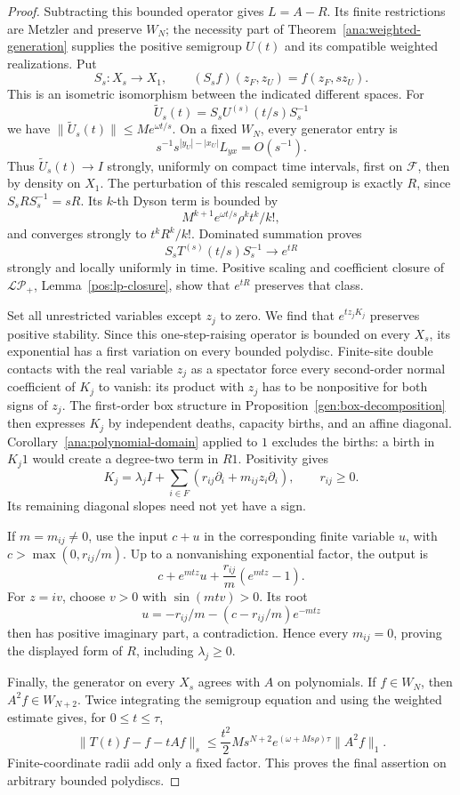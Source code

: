 \documentclass[reqno]{amsart}
\theoremstyle{definition}
\theoremstyle{remark}
\begin{document}
\begin{proof}
Subtracting this bounded operator gives \(L=A-R\).  Its finite restrictions
are Metzler and preserve \(W_N\); the necessity part of
Theorem~\ref{ana:weighted-generation} supplies the positive semigroup
\(U(t)\) and its compatible weighted realizations.  Put
\[
 S_s:X_s\longrightarrow X_1,\qquad
 (S_sf)(z_F,z_U)=f(z_F,sz_U).
\]
This is an isometric isomorphism between the indicated different spaces.
For
\[
 \widetilde U_s(t)=S_sU^{(s)}(t/s)S_s^{-1}
\]
we have \(\|\widetilde U_s(t)\|\le Me^{\omega t/s}\).
On a fixed \(W_N\), every generator entry is
\[
 s^{-1}s^{|y_U|-|x_U|}L_{yx}=O(s^{-1}).
\]
Thus \(\widetilde U_s(t)\to I\) strongly, uniformly on compact time
intervals, first on \(\mathcal F\), then by density on \(X_1\).
The perturbation of this rescaled semigroup is exactly \(R\), since
\(S_sRS_s^{-1}=sR\).  Its \(k\)-th Dyson term is bounded by
\[
 M^{k+1}e^{\omega t/s}\rho^k t^k/k!,
\]
and converges strongly to \(t^kR^k/k!\).  Dominated summation proves
\[
 S_sT^{(s)}(t/s)S_s^{-1}\longrightarrow e^{tR}
\]
strongly and locally uniformly in time.  Positive scaling and coefficient
closure of \(\mathcal{LP}_+\), Lemma~\ref{pos:lp-closure}, show that
\(e^{tR}\) preserves that class.

Set all unrestricted variables except \(z_j\) to zero.  We find that
\(e^{tz_jK_j}\) preserves positive stability.  Since this one-step-raising
operator is bounded on every \(X_s\), its exponential has a first variation
on every bounded polydisc.  Finite-site double contacts
with the real variable \(z_j\) as a spectator force every second-order
normal coefficient of \(K_j\) to vanish: its product with \(z_j\) has to be
nonpositive for both signs of \(z_j\).  The first-order box structure in
Proposition~\ref{gen:box-decomposition} then expresses \(K_j\) by independent deaths, capacity
births, and an affine diagonal.  Corollary~\ref{ana:polynomial-domain}
applied to \(1\) excludes the births: a birth in \(K_j1\) would create a
degree-two term in \(R1\).  Positivity gives
\[
 K_j=\lambda_j I+\sum_{i\in F}(r_{ij}\partial_i+m_{ij}z_i\partial_i),
 \qquad r_{ij}\ge0.
\]
Its remaining diagonal slopes need not yet have a sign.

If \(m=m_{ij}\ne0\), use the input \(c+u\) in the corresponding finite
variable \(u\), with \(c>\max(0,r_{ij}/m)\).  Up to a nonvanishing
exponential factor, the output is
\[
 c+e^{mtz}u+\frac{r_{ij}}m(e^{mtz}-1).
\]
For \(z=iv\), choose \(v>0\) with \(\sin(mtv)>0\).  Its root
\[
 u=-r_{ij}/m-(c-r_{ij}/m)e^{-mtz}
\]
then has positive imaginary part, a contradiction.  Hence every
\(m_{ij}=0\), proving the displayed form of \(R\), including
\(\lambda_j\ge0\).

Finally, the generator on every \(X_s\) agrees with \(A\) on polynomials.
If \(f\in W_N\), then \(A^2f\in W_{N+2}\).  Twice integrating the
semigroup equation and using the weighted estimate gives, for
\(0\le t\le\tau\),
\[
 \|T(t)f-f-tAf\|_s
 \le \frac{t^2}{2}M s^{N+2}
        e^{(\omega+Ms\rho)\tau}\|A^2f\|_1 .
\]
Finite-coordinate radii add only a fixed factor.  This proves the final
assertion on arbitrary bounded polydiscs.
\end{proof}
\end{document}
